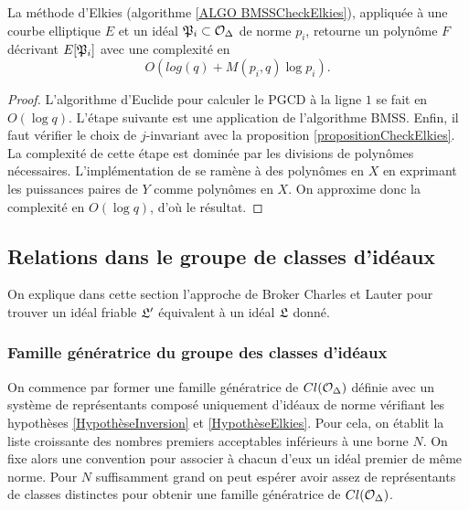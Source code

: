 \begin{Prop}
	La méthode d'Elkies (algorithme \ref{ALGO BMSSCheckElkies}), appliquée à une courbe elliptique $E$ et un idéal $\mathfrak{P}_{i}\subset\mathcal{O}_{\Delta}$ de norme $p_{i}$, retourne un polynôme $F$ décrivant $E[\mathfrak{P}_{i}]$ avec une complexité en 
	\begin{equation*}
		O\left( log(q) + M(p_{i},q)\log p_{i}\right).
	\end{equation*}
\end{Prop}

\begin{proof}
	L'algorithme d'Euclide pour calculer le PGCD à la ligne $1$ se fait en $O(\log q)$. L'étape suivante est une application de l'algorithme BMSS. Enfin, il faut vérifier le choix de $j$-invariant avec la proposition \ref{propositionCheckElkies}.
	La complexité de cette étape est dominée par les divisions de polynômes nécessaires. L'implémentation de \cite{Pegasis} se ramène à des polynômes en $X$ en exprimant les puissances paires de $Y$ comme polynômes en $X$. On approxime donc la complexité en $O(\log q)$, d'où le résultat.
\end{proof}

\subsection{Relations dans le groupe de classes d'idéaux}\label{SECTION CalculfactoClasse}

On explique dans cette section l'approche de Broker Charles et Lauter \cite{BrokerCharlesLauter} pour trouver un idéal friable $\mathfrak{L}'$ équivalent à un idéal $\mathfrak{L}$ donné. 

\subsubsection{Famille génératrice du groupe des classes d'idéaux}

On commence par former une famille génératrice de $Cl(\mathcal{O}_{\Delta})$ définie avec un système de représentants composé uniquement d'idéaux de norme vérifiant les hypothèses \ref{HypothèseInversion} et \ref{HypothèseElkies}. Pour cela, on établit la liste croissante des nombres premiers acceptables inférieurs à une borne $N$. On fixe alors une convention pour associer à chacun d'eux un idéal premier de même norme. Pour $N$ suffisamment grand on peut espérer avoir assez de représentants de classes distinctes pour obtenir une famille génératrice de $Cl(\mathcal{O}_{\Delta})$.

